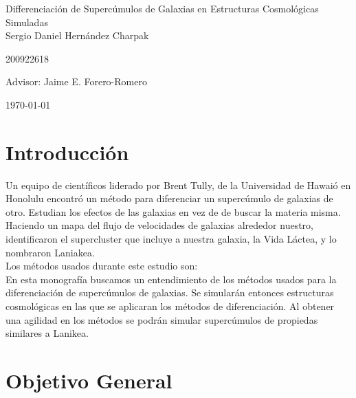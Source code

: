 \documentclass[12pt]{article}
\begin{document}
\begin{center}
\Huge
Differenciaci\'{o}n de Superc\'{u}mulos de Galaxias en Estructuras Cosmol\'{o}gicas Simuladas\\
\vspace{3mm}
\Large Sergio Daniel Hern\'{a}ndez Charpak

\large
200922618

\vspace{2mm}
\Large
Advisor: Jaime E. Forero-Romero

\normalsize
\vspace{2mm}

\today
\end{center}


\normalsize
\section{Introducci\'{o}n}

Un equipo de cient\'{i}ficos liderado por Brent Tully\cite{NatureTullyCourtois}, de la Universidad de Hawai\'o en Honolulu encontr\'{o} un m\'{e}todo para diferenciar un superc\'{u}mulo de galaxias de otro. Estudian los efectos de las galaxias en vez de de buscar la materia misma. Haciendo un mapa del flujo de velocidades de galaxias alrededor nuestro, identificaron el supercluster que incluye a nuestra galaxia, la Vida L\'{a}ctea, y lo nombraron Laniakea.
\\


Los m\'{e}todos usados durante este estudio son:
\\

En esta monograf\'{i}a buscamos un entendimiento de los m\'{e}todos usados para la diferenciaci\'{o}n de superc\'{u}mulos de galaxias. Se simular\'{a}n entonces estructuras cosmol\'{o}gicas en las que se aplicaran los m\'{e}todos de diferenciaci\'{o}n. Al obtener una agilidad en los m\'{e}todos se podr\'{a}n simular superc\'{u}mulos de propiedas similares a Lanikea.
\\

\section{Objetivo General}
\end{document}
